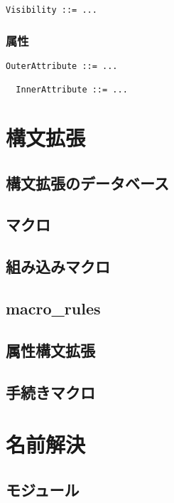 \documentclass[dvipdfmx,uplatex,papersize,a4paper,10pt]{jsbook}
\theoremstyle{definition}
\begin{document}
\begin{lstlisting}[language=BNFLike, gobble=2]
  Visibility ::= ...
\end{lstlisting}

\subsection{属性}

\begin{lstlisting}[language=BNFLike, gobble=2]
  OuterAttribute ::= ...

  InnerAttribute ::= ...
\end{lstlisting}



\chapter{構文拡張}

\section{構文拡張のデータベース}

\section{マクロ}

\section{組み込みマクロ}

\section{macro\_rules}

\section{属性構文拡張}

\section{手続きマクロ}



\chapter{名前解決}

\section{モジュール}
\end{document}
